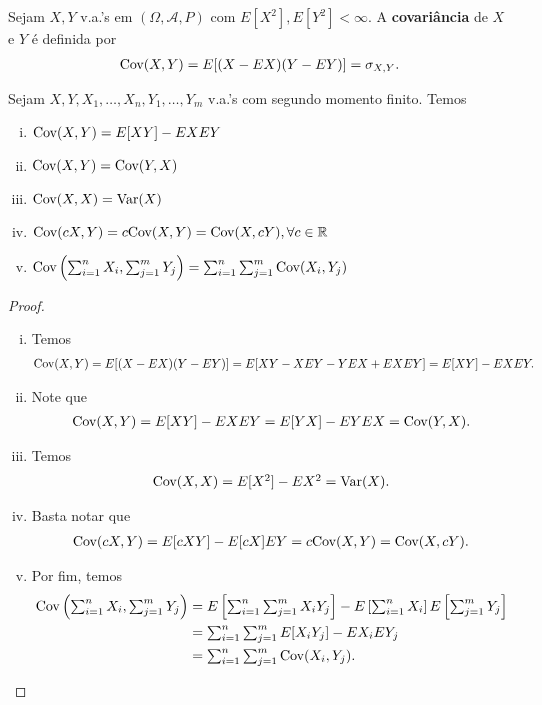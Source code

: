 \documentclass[../Notas.tex]{subfiles}
\begin{document}
\begin{definition}[Covariância]
Sejam $X,Y$ v.a.'s em $(\Omega, \mathcal{A}, P)$ com $E[X^2], E[Y^2] < \infty$. A \textbf{covariância} de $X$ e $Y$ é definida por
\begin{align*}
    \text{Cov}(X,Y) = E[(X-EX)(Y-EY)] = \sigma_{X,Y}.
\end{align*}
\end{definition}

\begin{proposition}
Sejam $X, Y, X_1, \dots, X_n, Y_1, \dots, Y_m$ v.a.'s com segundo momento finito. Temos
\begin{enumerate}[(i)]
    \item $\text{Cov}(X,Y) = E[XY] - EXEY$
    \item $\text{Cov}(X,Y) = \text{Cov}(Y,X)$
    \item $\text{Cov}(X,X) = \text{Var}(X)$
    \item $\text{Cov}(cX,Y) = c\text{Cov}(X,Y) = \text{Cov}(X,cY), \forall c\in\mathbb{R}$
    \item $\textstyle{ \text{Cov}\left( \sum_{i=1}^{n}X_i, \sum_{j=1}^{m}Y_j \right) = \sum_{i=1}^{n}\sum_{j=1}^{m} \text{Cov}(X_i, Y_j) }$
\end{enumerate}
\end{proposition}

\begin{proof}
\begin{enumerate}[(i)]
    \item Temos
    \begin{align*}
        \text{Cov}(X,Y) = E[(X-EX)(Y-EY)] = E[XY - XEY - YEX + EXEY] = E[XY] - EXEY.
    \end{align*}
    \item Note que
    \begin{align*}
        \text{Cov}(X,Y) = E[XY] - EXEY = E[YX] - EYEX = \text{Cov}(Y,X).
    \end{align*}
    \item Temos
    \begin{align*}
        \Cov(X,X) = E[X^2] - EX^2 = \Var(X).
    \end{align*}
    \item Basta notar que
    \begin{align*}
        \text{Cov}(cX, Y) = E[cXY] - E[cX]EY = c\text{Cov}(X,Y) = \text{Cov}(X,cY).
    \end{align*}
    \item Por fim, temos
    \begin{align*}
        \Cov\left( \sum_{i=1}^{n}X_i, \sum_{j=1}^{m}Y_j \right) &= E\left[ \sum_{i=1}^{n}\sum_{j=1}^{m} X_iY_j \right] - E\left[ \sum_{i=1}^{n}X_i \right]E\left[ \sum_{j=1}^{m}Y_j \right] \\
        &= \sum_{i=1}^{n}\sum_{j=1}^{m} E[X_iY_j] - EX_iEY_j \\
        &= \sum_{i=1}^{n}\sum_{j=1}^{m} \Cov(X_i, Y_j).
    \end{align*}
\end{enumerate}
\end{proof}
\end{document}
